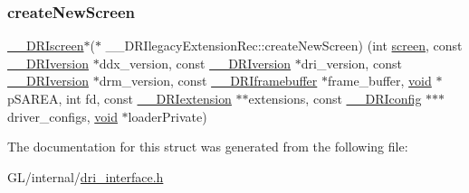 \subsubsection{\texorpdfstring{create\+New\+Screen}{createNewScreen}}
{\footnotesize\ttfamily \hyperlink{dri__interface_8h_a9961b01d421ee1fd6ed3c05acc9ca561}{\+\_\+\+\_\+\+D\+R\+Iscreen}$\ast$($\ast$ \+\_\+\+\_\+\+D\+R\+Ilegacy\+Extension\+Rec\+::create\+New\+Screen) (int \hyperlink{cad_8h_ae04e09e4e3831bfc1632c509ae37dcec}{screen}, const \hyperlink{dri__interface_8h_a824c6134dbdbbf2f62c2c6a44fcbdf02}{\+\_\+\+\_\+\+D\+R\+Iversion} $\ast$ddx\+\_\+version, const \hyperlink{dri__interface_8h_a824c6134dbdbbf2f62c2c6a44fcbdf02}{\+\_\+\+\_\+\+D\+R\+Iversion} $\ast$dri\+\_\+version, const \hyperlink{dri__interface_8h_a824c6134dbdbbf2f62c2c6a44fcbdf02}{\+\_\+\+\_\+\+D\+R\+Iversion} $\ast$drm\+\_\+version, const \hyperlink{dri__interface_8h_a8cb888e603d44eef2287cacd07fc5e2c}{\+\_\+\+\_\+\+D\+R\+Iframebuffer} $\ast$frame\+\_\+buffer, \hyperlink{_s_d_l__opengles2__gl2ext_8h_ae5d8fa23ad07c48bb609509eae494c95}{void} $\ast$p\+S\+A\+R\+EA, int fd, const \hyperlink{dri__interface_8h_a4e0a61c8ece00d2b2c6792a9a1b55385}{\+\_\+\+\_\+\+D\+R\+Iextension} $\ast$$\ast$extensions, const \hyperlink{dri__interface_8h_aeac81999efbbf8b1d6886338e3ea24d9}{\+\_\+\+\_\+\+D\+R\+Iconfig} $\ast$$\ast$$\ast$driver\+\_\+configs, \hyperlink{_s_d_l__opengles2__gl2ext_8h_ae5d8fa23ad07c48bb609509eae494c95}{void} $\ast$loader\+Private)}



The documentation for this struct was generated from the following file\+:\begin{DoxyCompactItemize}
\item 
G\+L/internal/\hyperlink{dri__interface_8h}{dri\+\_\+interface.\+h}\end{DoxyCompactItemize}
